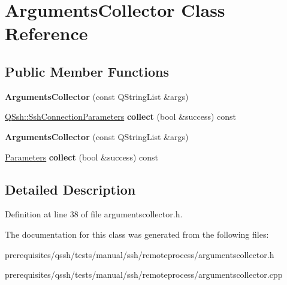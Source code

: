 \hypertarget{class_arguments_collector}{}\section{Arguments\+Collector Class Reference}
\label{class_arguments_collector}
\subsection*{Public Member Functions}
\begin{DoxyCompactItemize}
\item 
\mbox{\label{class_arguments_collector_aaac00b51aea3af7c0bcde3553ba12846}} 
{\bfseries Arguments\+Collector} (const Q\+String\+List \&args)
\item 
\mbox{\label{class_arguments_collector_ac183b4a6ea49214f44a729a3ff2ed836}} 
\mbox{\hyperlink{class_q_ssh_1_1_ssh_connection_parameters}{Q\+Ssh\+::\+Ssh\+Connection\+Parameters}} {\bfseries collect} (bool \&success) const
\item 
\mbox{\label{class_arguments_collector_aaac00b51aea3af7c0bcde3553ba12846}} 
{\bfseries Arguments\+Collector} (const Q\+String\+List \&args)
\item 
\mbox{\label{class_arguments_collector_ac183b4a6ea49214f44a729a3ff2ed836}} 
\mbox{\hyperlink{struct_parameters}{Parameters}} {\bfseries collect} (bool \&success) const
\end{DoxyCompactItemize}


\subsection{Detailed Description}


Definition at line 38 of file argumentscollector.\+h.



The documentation for this class was generated from the following files\+:\begin{DoxyCompactItemize}
\item 
prerequisites/qssh/tests/manual/ssh/remoteprocess/argumentscollector.\+h\item 
prerequisites/qssh/tests/manual/ssh/remoteprocess/argumentscollector.\+cpp\end{DoxyCompactItemize}

